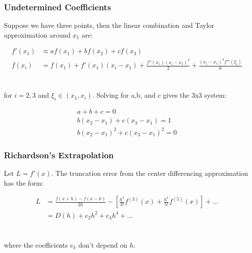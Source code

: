\documentclass{beamer}
\begin{document}
\begin{frame}
\frametitle{Undetermined Coefficients}

Suppose we have three points, then the linear combination and Taylor approximation around $x_1$ are:

\begin{align*}
f'(x_1) &\approx af(x_1) + bf(x_2) + cf(x_3)\\
f(x_i) &= f(x_1) + f'(x_1)(x_i - x_1) + \frac{f''(x_1)(x_i-x_1)^2}{2}+\frac{(x_i-x_1)^3 f'''(\xi_i)}{6}
\end{align*}
\hfill\\
\hfill\\
for $i = 2,3$ and $\xi_i \in (x_1,x_i)$.  Solving for a,b, and c gives the 3x3 system:

\begin{align*}
a+b+c=0\\
b(x_2-x_1) + c(x_3-x_1) = 1\\
b(x_2-x_1)^2 + c(x_3-x_1)^2 = 0
\end{align*}

\end{frame}

\begin{frame}
\frametitle{Richardson’s Extrapolation}

Let $L = f'(x)$. The truncation error from the center differencing approximation has the form:

\begin{align*}
L &= \frac{f(x+h) - f(x-h)}{2h} - \left[ \frac{h^2}{3!}f^{(3)}(x) + \frac{h^4}{5!}f^{(5)}(x) \right] + \ldots \\
&= D(h) + e_2h^2 + e_4 h^4 + \ldots
\end{align*}
\hfill\\ \hfill\\
where the coefficients $e_k$ don't depend on $h$.  

\end{frame}

\end{document}
